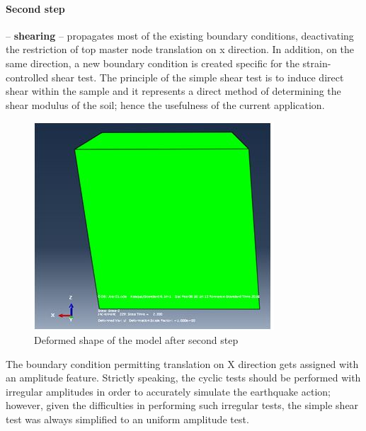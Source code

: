 \documentclass[12pt,a4paper]{report}
\begin{document}
\paragraph{Second step}
 – \textbf{shearing} – propagates most of the existing boundary conditions, deactivating the restriction of top master node translation on x direction. In addition, on the same direction, a new boundary condition is created specific for the strain-controlled shear test. The principle of the simple shear test is to induce direct shear within the sample and it represents a direct method of determining the shear modulus of the soil; hence the usefulness of the current application.

\begin{figure}[h!]
	\centering
	\includegraphics[width=0.33\linewidth]{"deformed"}
	\caption{Deformed shape of the model after second step}
	\label{deformed}
\end{figure}

The boundary condition permitting translation on X direction gets assigned with an amplitude feature. Strictly speaking, the cyclic tests should be performed with irregular amplitudes in order to accurately simulate the earthquake action; however, given the difficulties in performing such irregular tests, the simple shear test was always simplified to an uniform amplitude test. 
\end{document}
